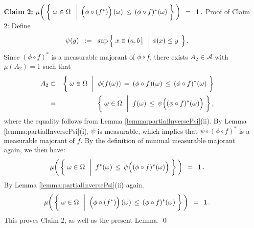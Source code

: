 \vskip 0.5cm
\noindent
\textbf{Claim 2:}\quad
$\mu\!\left(\,\left\{\;
	\omega \in \Omega
	\,\;\left\vert\;\;
	\left(\overset{{\color{white}.}}{\phi} \circ (f^{*})\right)(\omega)
		\,\overset{{\color{white}\vert}}{\leq}\,
		(\phi \circ f)^{*}(\omega)
	\right.
\,\right\}\,\right)
\,\;=\;\, 1\,.
$
\vskip 0.2cm
\noindent
Proof of Claim 2:\;\;
Define
\begin{equation*}
\psi(y)
\;\; := \;\;
	\sup\left\{\;
		x \in (a,b\,]
	\,\;\left\vert\;\,
		\overset{{\color{white}.}}{\phi}(x) \leq y
	\right.
	\;\right\}.
\end{equation*}
Since $(\phi \circ f)^{*}$ is a measurable majorant of $\phi \circ f$,
there exists $A_{2} \in \mathcal{A}$ with $\mu(A_{2}) = 1$ such that
\begin{eqnarray*}
A_{2}
&\subset&
	\left\{\;
		\omega \in \Omega
		\,\;\left\vert\;\;
		\phi(f(\omega)) \,=\, (\phi \circ f)(\omega) \,\overset{{\color{white}\vert}}{\leq}\, (\phi \circ f)^{*}(\omega)
	\right.
	\,\right\}
\\
& = &
	\left\{\;
		\omega \in \Omega
		\,\;\left\vert\;\;
		f(\omega)
			\,\overset{{\color{white}\vert}}{\leq}\,
				\psi\!\left((\overset{{\color{white}.}}{\phi} \circ f)^{*}(\omega)\right)
	\right.
	\,\right\},
\end{eqnarray*}
where the equality follows from Lemma \ref{lemma:partialInversePsi}(ii).
By Lemma \ref{lemma:partialInversePsi}(i), $\psi$ is measurable,
which implies that $\psi \circ (\phi \circ f)^{*}$ is a measurable majorant of $f$.
By the definition of minimal measurable majorant again, we then have:
\begin{equation*}
\mu\!\left(\,\left\{\;
	\omega \in \Omega
	\,\;\left\vert\;\;
	f^{*}(\omega) \,\overset{{\color{white}\vert}}{\leq}\, \psi\!\left((\overset{{\color{white}.}}{\phi} \circ f)^{*}(\omega)\right)
	\right.
\,\right\}\,\right)
\,\;=\;\, 1\,.
\end{equation*}
By Lemma \ref{lemma:partialInversePsi}(ii) again,
\begin{equation*}
\mu\!\left(\,\left\{\;
	\omega \in \Omega
	\,\;\left\vert\;\;
	\left(\overset{{\color{white}.}}{\phi} \circ (f^{*})\right)(\omega)
		\,\overset{{\color{white}\vert}}{\leq}\,
		(\phi \circ f)^{*}(\omega)
	\right.
\,\right\}\,\right)
\,\;=\;\, 1\,.
\end{equation*}
This proves Claim 2, as well as the present Lemma.
\qed


\renewcommand{\theenumi}{\roman{enumi}}
\renewcommand{\labelenumi}{\textnormal{(\theenumi)}$\;\;$}

